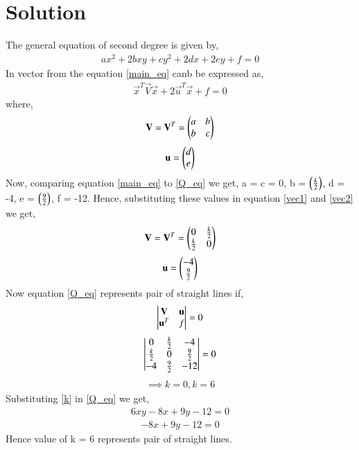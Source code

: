 \documentclass[journal,12pt,twocolumn]{IEEEtran}
\begin{document}
\section{Solution}
The general equation of second degree is given by,
\begin{align}
ax^2 + 2bxy + cy^2 + 2dx +2ey +f = 0
\label{main_eq}
\end{align}
In vector from the equation \eqref{main_eq} canb be expressed as,
\begin{align}
\vec{x}^T\vec{V}\vec{x} + 2\vec{u}^T\vec{x} + f = 0 
\label{line_vec}
\end{align}
where,
\begin{align}
\mathbf{V} = \mathbf{V}^T = \begin{pmatrix}a&b\\b&c\end{pmatrix}
\label{vec1}
\end{align}
\begin{align}
\mathbf{u} = \begin{pmatrix}d\\e\end{pmatrix}
\label{vec2}
\end{align}
Now, comparing equation \eqref{main_eq} to \eqref{Q_eq} we get, a = c = 0, b = $\left(\frac{k}{2}\right)$, d = -4, e = $\left(\frac{9}{2}\right)$, f = -12.  
Hence, substituting these values in equation \eqref{vec1} and \eqref{vec2} we get,
\begin{align}
\mathbf{V} = \mathbf{V}^T = \begin{pmatrix}0&\frac{k}{2}\\\frac{k}{2}&0\end{pmatrix}
\end{align}
\begin{align}
\mathbf{u} = \begin{pmatrix}-4\\\frac{9}{2}\end{pmatrix}
\end{align}
Now equation \eqref{Q_eq} represents pair of straight lines if,
\begin{align}
\begin{vmatrix}\mathbf{V}&\mathbf{u}\\\mathbf{u}^T&f\end{vmatrix} = 0
\end{align}
\begin{align}
\begin{vmatrix}0&\frac{k}{2}&-4\\\frac{k}{2}&0&\frac{9}{2}\\-4&\frac{9}{2}&-12\end{vmatrix} = 0
\end{align}
\begin{align}
\implies k =0 , k = 6 
\label{k}
\end{align}
Substituting \eqref{k} in \eqref{Q_eq} we get,
\begin{align}
6xy-8x+9y-12 = 0
\end{align}
\begin{align}
-8x+9y-12 = 0
\end{align}
Hence value of k = 6 represents pair of straight lines.
\end{document}
